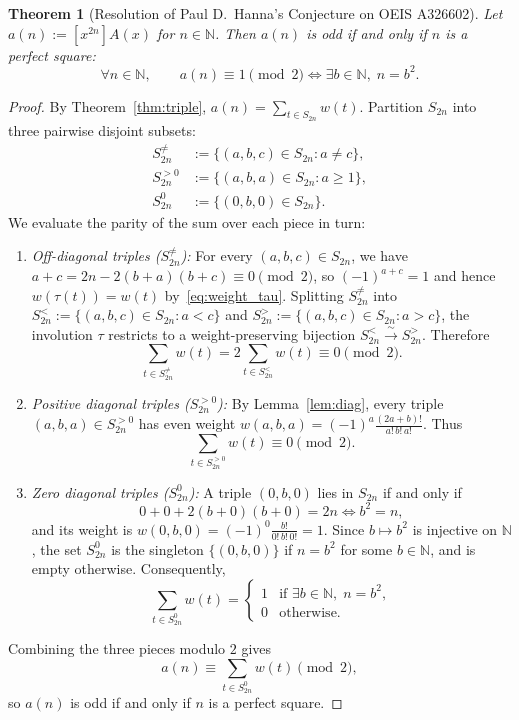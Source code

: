 \documentclass[11pt,a4paper]{article}
\newtheorem{theorem}{Theorem}[section]
\theoremstyle{definition}
\theoremstyle{remark}
\newcommand{\N}{\mathbb{N}}
\newcommand{\coeff}[1]{[x^{#1}]}
\begin{document}
\begin{theorem}[Resolution of Paul D.~Hanna's Conjecture on OEIS A326602]\label{thm:main}
Let $a(n) := \coeff{2n} A(x)$ for $n \in \N$. Then $a(n)$ is odd if and only if $n$ is a perfect square:
\[
\forall n \in \N, \qquad a(n) \equiv 1 \pmod{2} \iff \exists b \in \N,\; n = b^2.
\]
\end{theorem}

\begin{proof}
By Theorem~\ref{thm:triple}, $a(n) = \sum_{t \in S_{2n}} w(t)$. Partition $S_{2n}$ into three pairwise disjoint subsets:
\begin{align*}
S_{2n}^{\neq} &:= \{(a,b,c) \in S_{2n} : a \ne c\}, \\
S_{2n}^{>0}   &:= \{(a,b,a) \in S_{2n} : a \ge 1\}, \\
S_{2n}^{0}    &:= \{(0,b,0) \in S_{2n}\}.
\end{align*}
We evaluate the parity of the sum over each piece in turn:
\begin{enumerate}
\item \emph{Off-diagonal triples ($S_{2n}^{\neq}$):} For every $(a,b,c) \in S_{2n}$, we have $a + c = 2n - 2(b+a)(b+c) \equiv 0 \pmod{2}$, so $(-1)^{a+c} = 1$ and hence $w(\tau(t)) = w(t)$ by~\eqref{eq:weight_tau}. Splitting $S_{2n}^{\neq}$ into $S_{2n}^{<} := \{(a,b,c) \in S_{2n} : a < c\}$ and $S_{2n}^{>} := \{(a,b,c) \in S_{2n} : a > c\}$, the involution $\tau$ restricts to a weight-preserving bijection $S_{2n}^{<} \xrightarrow{\sim} S_{2n}^{>}$. Therefore
\[
\sum_{t \in S_{2n}^{\neq}} w(t) = 2 \sum_{t \in S_{2n}^{<}} w(t) \equiv 0 \pmod{2}.
\]

\item \emph{Positive diagonal triples ($S_{2n}^{>0}$):} By Lemma~\ref{lem:diag}, every triple $(a,b,a) \in S_{2n}^{>0}$ has even weight $w(a,b,a) = (-1)^a \frac{(2a+b)!}{a!\,b!\,a!}$. Thus
\[
\sum_{t \in S_{2n}^{>0}} w(t) \equiv 0 \pmod{2}.
\]

\item \emph{Zero diagonal triples ($S_{2n}^{0}$):} A triple $(0,b,0)$ lies in $S_{2n}$ if and only if
\[
0 + 0 + 2(b + 0)(b + 0) = 2n \iff b^2 = n,
\]
and its weight is $w(0,b,0) = (-1)^0 \frac{b!}{0!\,b!\,0!} = 1$. Since $b \mapsto b^2$ is injective on $\N$, the set $S_{2n}^{0}$ is the singleton $\{(0,b,0)\}$ if $n = b^2$ for some $b \in \N$, and is empty otherwise. Consequently,
\[
\sum_{t \in S_{2n}^{0}} w(t) =
\begin{cases}
1 & \text{if } \exists b \in \N,\; n = b^2,\\
0 & \text{otherwise.}
\end{cases}
\]
\end{enumerate}
Combining the three pieces modulo $2$ gives
\[
a(n) \equiv \sum_{t \in S_{2n}^{0}} w(t) \pmod{2},
\]
so $a(n)$ is odd if and only if $n$ is a perfect square.
\end{proof}
\end{document}
